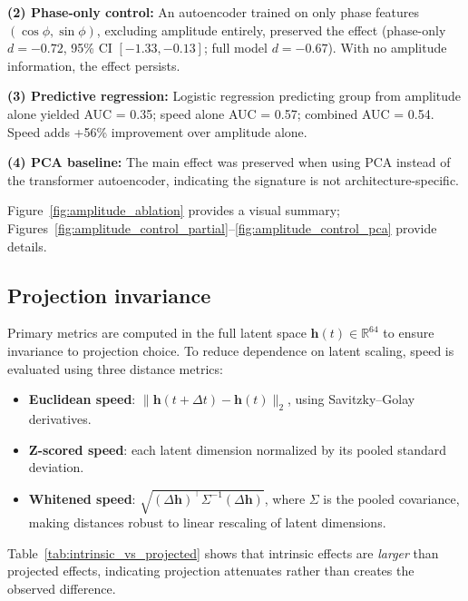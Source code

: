 \documentclass[5p,twocolumn,authoryear]{elsarticle}
\begin{document}
\textbf{(2) Phase-only control:} An autoencoder trained on only phase features $(\cos\phi, \sin\phi)$, excluding amplitude entirely, preserved the effect (phase-only $d = -0.72$, 95\% CI $[-1.33, -0.13]$; full model $d = -0.67$). With no amplitude information, the effect persists.

\textbf{(3) Predictive regression:} Logistic regression predicting group from amplitude alone yielded AUC = 0.35; speed alone AUC = 0.57; combined AUC = 0.54. Speed adds +56\% improvement over amplitude alone.

\textbf{(4) PCA baseline:} The main effect was preserved when using PCA instead of the transformer autoencoder, indicating the signature is not architecture-specific.

Figure~\ref{fig:amplitude_ablation} provides a visual summary; Figures~\ref{fig:amplitude_control_partial}--\ref{fig:amplitude_control_pca} provide details.

\subsection{Projection invariance}
\label{app:intrinsic_metrics}

Primary metrics are computed in the full latent space $\mathbf{h}(t) \in \mathbb{R}^{64}$ to ensure invariance to projection choice. To reduce dependence on latent scaling, speed is evaluated using three distance metrics:
\begin{itemize}
    \item \textbf{Euclidean speed}: $\|\mathbf{h}(t+\Delta t) - \mathbf{h}(t)\|_2$, using Savitzky--Golay derivatives.
    \item \textbf{Z-scored speed}: each latent dimension normalized by its pooled standard deviation.
    \item \textbf{Whitened speed}: $\sqrt{(\Delta\mathbf{h})^\top \Sigma^{-1} (\Delta\mathbf{h})}$, where $\Sigma$ is the pooled covariance, making distances robust to linear rescaling of latent dimensions.
\end{itemize}
Table~\ref{tab:intrinsic_vs_projected} shows that intrinsic effects are \emph{larger} than projected effects, indicating projection attenuates rather than creates the observed difference.
\end{document}
